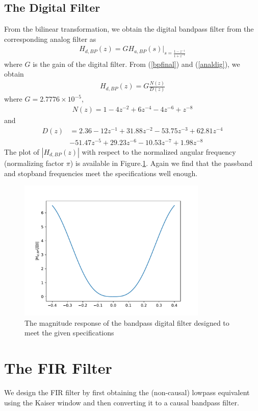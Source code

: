 \documentclass[journal,12pt,twocolumn]{IEEEtran}
\begin{document}
\subsection{The Digital Filter}
From the bilinear transformation, we obtain the digital bandpass filter from the corresponding analog filter as
\begin{eqnarray}
\label{analdig}
H_{d,BP}(z) = GH_{a,BP}(s)\vert_{s = \frac{1-z^{-1}}{1 + z^{-1}}}
\end{eqnarray}
where $G$ is the gain of the digital filter.  From (\ref{bpfinal}) and (\ref{analdig}), we obtain
\begin{eqnarray}
H_{d,BP}(z) = G \frac{N(z)}{D(z)}
\end{eqnarray}
where $G = 2.7776 \times 10^{-5}$,
\begin{eqnarray}
N(z) =  1 - 4 z^{-2} + 6 z^{-4} - 4z^{-6} + z^{-8} 
\end{eqnarray}
and
\begin{align}
D(z) &= 2.36 -12z^{-1} + 31.88z^{-2}  -53.75z^{-3} +  62.81z^{-4}\nonumber \\
  &-51.47z^{-5}+   29.23z^{-6}  -10.53z^{-7} +1.98z^{-8}
\end{align}
The plot of $|H_{d,BP}(z)|$ with respect to the normalized angular frequency (normalizing factor $\pi$) is available in Figure.\ref{fig:BP_digital}.  Again we
find that the passband and stopband frequencies meet the specifications well enough.
\begin{figure}[!ht]
    \centering
    \includegraphics[width = 9cm]{./figs/iir/BP_digital}
    \caption{The magnitude response of the bandpass digital filter designed to meet the given specifications}
    \label{fig:BP_digital}
\end{figure}
\section{The FIR Filter}
We design the FIR filter by first obtaining the (non-causal) lowpass equivalent using the Kaiser window
and then
converting it to a causal bandpass filter.
\end{document}
